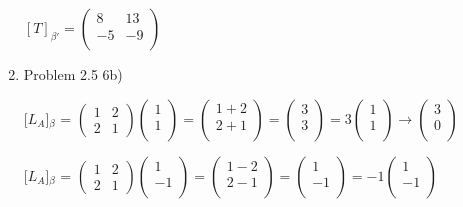 \documentclass[12pt]{article}
\begin{document}
\begin{enumerate}
    $[T]_{\beta'} = \begin{pmatrix}
        8 & 13 \\
        -5 & -9 \\
    \end{pmatrix}$
    
    
    \item Problem 2.5 6b)

    [$L_A$]$_\beta$ = $\begin{pmatrix}
        1 & 2 \\
        2 & 1
    \end{pmatrix} \begin{pmatrix}
        1 \\
        1 \\
    \end{pmatrix} = \begin{pmatrix}
        1 + 2 \\
        2 + 1 \\
    \end{pmatrix} = \begin{pmatrix}
        3 \\
        3 \\
    \end{pmatrix} = 3\begin{pmatrix}
        1 \\
        1 \\
    \end{pmatrix} \rightarrow \begin{pmatrix}
        3 \\
        0 \\
    \end{pmatrix}$ 

    
    [$L_A$]$_\beta$ = $\begin{pmatrix}
        1 & 2 \\
        2 & 1
    \end{pmatrix} \begin{pmatrix}
        1 \\
        -1 \\
    \end{pmatrix} = \begin{pmatrix}
        1 - 2 \\
        2 - 1 \\
    \end{pmatrix} = \begin{pmatrix}
        1 \\
        -1 \\
    \end{pmatrix} = -1\begin{pmatrix}
        1 \\
        -1 \\
    \end{pmatrix}$ 


\end{enumerate}
\end{document}
